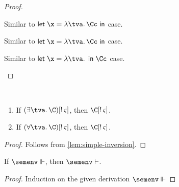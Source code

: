 \documentclass[acmsmall,screen,nonacm,review]{acmart}
\begin{document}
\begin{lemma}
\begin{proof}
\begin{proofcases}
      \proofcase{$\clet \x \tv \c \Cc$}

	\begin{llproof}
	  Similar to $\clet \x \tv \Cc \c$ case.
	\end{llproof}

      \proofcase{$\cletr \x \tv \tvs \Cc \c$}

	\begin{llproof}
	  Similar to $\clet \x \tv \Cc \c$ case.
	\end{llproof}

      \proofcase{$\cletr \x \tv \tvs \c \Cc$}

	\begin{llproof}
	  Similar to $\clet \x \tv \c \Cc$ case.
	\end{llproof}
    \end{proofcases}
  \end{proof}
\end{lemma}

\begin{lemma}
  \label{lem:unicity-inversion}~
  \begin{enumerate}[(\roman*)]
    \item If $\Cshape {\parens{\cexists \tv \C}} \t \sh$, then $\Cshape \C \t \sh$.
    \item If $\Cshape {\parens{\cfor \tv \C}} \t \sh$, then $\Cshape \C \t \sh$.
  \end{enumerate}
  \begin{proof}
    Follows from \cref{lem:simple-inversion}.
  \end{proof}
\end{lemma}

\begin{lemma}[Decanonicalization]
  \label{lem:decanonicalization}
  If $\semenv \Th \c$, then $\semenv \th \c$.
  \begin{proof}
    Induction on the given derivation $\semenv \Th \c$
  \end{proof}
\end{lemma}
\end{document}
